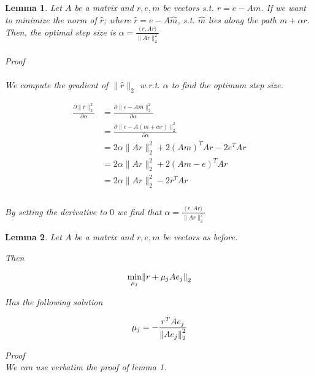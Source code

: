 \documentclass[paper=A4, fontsize=11pt]{scrartcl}
\let\originalleft\left
\let\originalright\right
\renewcommand{\left}{\mathopen{}\mathclose\bgroup\originalleft}
\renewcommand{\right}{\aftergroup\egroup\originalright}
\newtheorem{lemma}{Lemma}[section]
\theoremstyle{remark}
\begin{document}
	\begin{lemma}
		
		Let $A$ be a matrix and $r, e, m$ be vectors s.t. $r = e - Am$. If we want to minimize the norm of $\hat{r}$; where $\hat{r} = e - A\hat{m}$, s.t. $\hat{m}$ lies along the path $m + \alpha r$. \\
		Then, the optimal step size is $\alpha = \frac{\langle\,r,Ar\rangle}{\|Ar\|_{2}^{2}}$
		\\\\
		Proof 
		\\\\
		We compute the gradient of $\|\hat{r}\|_{2}$ w.r.t. $\alpha$ to find the optimum step size. 
		
		
		
		
		\begin{equation}
		\begin{aligned}
		\frac{\partial \|\hat{r} \|_{2}^{2}}{\partial \alpha} 
		& = \frac{\partial \|e - A\hat{m}\|_{2}^{2}}{\partial \alpha} \\
		& = \frac{\partial \|e - A(m + \alpha r)\|_{2}^{2}}{\partial \alpha} \\
		& = 2\alpha \|Ar\|_{2}^{2}  + 2(Am)^{T}Ar - 2e^{T}Ar \\
		& = 2\alpha \|Ar\|_{2}^{2}  + 2(Am - e)^{T}Ar \\
		& = 2\alpha \|Ar\|_{2}^{2}  - 2r^{T}Ar \\
		\\
		\end{aligned}
		\end{equation}
		
		By setting the derivative to $0$ we find that $\alpha = \frac{\langle\,r,Ar\rangle}{\|Ar\|_{2}^{2}}$
		
		
		
		
	\end{lemma}
	
	\begin{lemma}
		Let $A$ be a matrix and $r, e, m$ be vectors as before. 
		
		Then
		
		\begin{equation}
		\min _{\mu_{j}}\left\|r+\mu_{j} A e_{j}\right\|_{2}
		\end{equation}
		
		Has the following solution
		
		\begin{equation}
		\mu_{j}=-\frac{r^{T} A e_{j}}{\left\|A e_{j}\right\|_{2}^{2}}
		\end{equation}
		
		Proof
		\\
		We can use verbatim the proof of lemma 1.
	\end{lemma}
	
\end{document}
